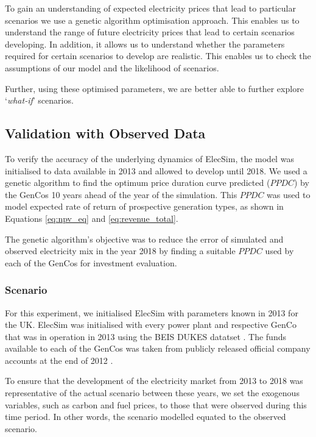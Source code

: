 To gain an understanding of expected electricity prices that lead to particular scenarios we use a genetic algorithm optimisation approach. This enables us to understand the range of future electricity prices that lead to certain scenarios developing. In addition, it allows us to understand whether the parameters required for certain scenarios to develop are realistic. This enables us to check the assumptions of our model and the likelihood of scenarios.

Further, using these optimised parameters, we are better able to further explore `\textit{what-if}' scenarios.




\subsection{Validation with Observed Data}
\label{sssec:validation}

To verify the accuracy of the underlying dynamics of ElecSim, the model was initialised to data available in 2013 and allowed to develop until 2018. We used a genetic algorithm to find the optimum price duration curve predicted ($PPDC$) by the GenCos 10 years ahead of the year of the simulation. This $PPDC$ was used to model expected rate of return of prospective generation types, as shown in Equations \ref{eq:npv_eq} and \ref{eq:revenue_total}. 

The genetic algorithm's objective was to reduce the error of simulated and observed electricity mix in the year 2018 by finding a suitable $PPDC$ used by each of the GenCos for investment evaluation.

\subsubsection{Scenario}

For this experiment, we initialised ElecSim with parameters known in 2013 for the UK. ElecSim was initialised with every power plant and respective GenCo that was in operation in 2013 using the BEIS DUKES datatset \cite{dukes_511}. The funds available to each of the GenCos was taken from publicly released official company accounts at the end of 2012 \cite{companies_house}.

To ensure that the development of the electricity market from 2013 to 2018 was representative of the actual scenario between these years, we set the exogenous variables, such as carbon and fuel prices, to those that were observed during this time period. In other words, the scenario modelled equated to the observed scenario. 

